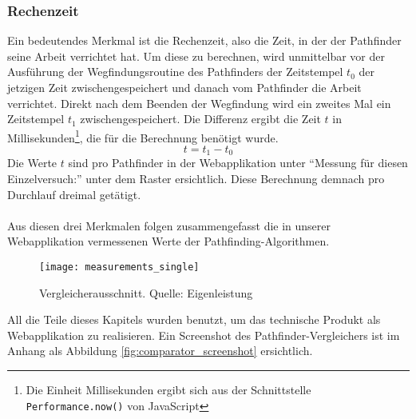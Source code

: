 \subsubsection{Rechenzeit}
Ein bedeutendes Merkmal ist die Rechenzeit, also die Zeit, in der der Pathfinder seine Arbeit verrichtet hat. 
Um diese zu berechnen, wird unmittelbar vor der Ausführung der Wegfindungsroutine des Pathfinders der Zeitstempel $t_0$ der jetzigen Zeit zwischengespeichert und danach vom Pathfinder die Arbeit verrichtet. 
Direkt nach dem Beenden der Wegfindung wird ein zweites Mal ein Zeitstempel $t_1$ zwischengespeichert. Die Differenz ergibt die Zeit $t$ in Millisekunden\footnote{Die Einheit Millisekunden ergibt sich aus der Schnittstelle \texttt{Performance.now()} von JavaScript}, die für die Berechnung benötigt wurde.
\begin{equation*}
  t = t_1 - t_0
\end{equation*}
Die Werte $t$ sind pro Pathfinder in der Webapplikation unter ``Messung für diesen Einzelversuch:'' unter dem Raster ersichtlich. Diese Berechnung demnach pro Durchlauf dreimal getätigt.
\\\\
Aus diesen drei Merkmalen folgen zusammengefasst die in unserer Webapplikation vermessenen Werte der Pathfinding-Algorithmen.
\begin{figure}[H]
  \centering
  \texttt{[image: measurements\_single]}
  \caption[Ausschnitt aus dem Pathfinding-Vergleicher für einzelne Vergleiche.]{Vergleicherausschnitt. Quelle: Eigenleistung}
  \label{fig:gui_konzept_comparator}
\end{figure}
All die Teile dieses Kapitels wurden benutzt, um das technische Produkt als Webapplikation zu realisieren. Ein Screenshot des Pathfinder-Vergleichers ist im Anhang als Abbildung \ref{fig:comparator_screenshot} ersichtlich.
